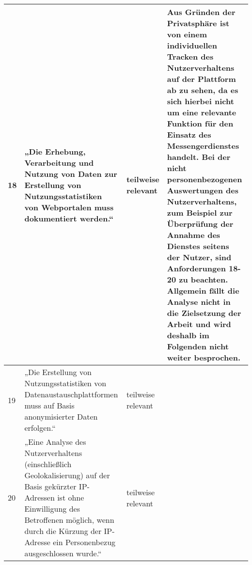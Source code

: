\begin{longtable}{p{0.6cm}|p{6cm}|p{2cm}|p{6cm}}
    18     & „Die Erhebung, Verarbeitung und Nutzung von Daten zur Erstellung von Nutzungsstatistiken von Webportalen muss dokumentiert werden.“                                                                                                                                                                  & teilweise relevant & Aus Gründen der Privatsphäre ist von einem individuellen Tracken des Nutzerverhaltens auf der Plattform ab zu sehen, da es sich hierbei nicht um eine relevante Funktion für den Einsatz des Messengerdienstes handelt. Bei der nicht personenbezogenen Auswertungen des Nutzerverhaltens, zum Beispiel zur Überprüfung der Annahme des Dienstes seitens der Nutzer, sind Anforderungen 18-20 zu beachten. Allgemein fällt die Analyse nicht in die Zielsetzung der Arbeit und wird deshalb im Folgenden nicht weiter besprochen.                                  \\ \hline
    19     & „Die Erstellung von Nutzungsstatistiken von Datenaustauschplattformen muss auf Basis anonymisierter Daten erfolgen.“                                                                                                                                                                                 & teilweise relevant &                                                                                                                                                                                                                                                                                                                                                                                                                                                                                                                                                                     \\ \hline
    20     & „Eine Analyse des Nutzerverhaltens (einschließlich Geolokalisierung) auf der Basis gekürzter IP-Adressen ist ohne Einwilligung des Betroffenen möglich, wenn durch die Kürzung der IP-Adresse ein Personenbezug ausgeschlossen wurde.“                                                               & teilweise relevant &                                                                                                                                                                                                                                                                                                                                                                                                                                                                                                                                                                     \\ \hline

\end{longtable}
